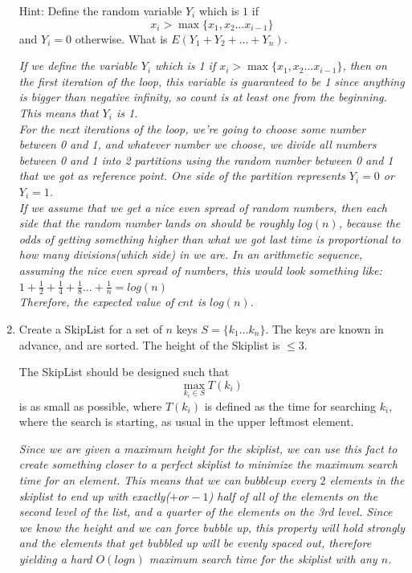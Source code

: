 \documentclass[11pt,epic,leqno,eepic,psfig,]{article}
\newcommand{\ans}[1]{{\color{brown}{\bf\Large Answer:} \sl  #1 \color{black}}}
\renewcommand{\i}{\item}
\begin{document}
\begin{enumerate}
Hint: Define the random variable $Y_i$ which is $1$ if
$$x_i > \max\{x_1, x_2\dots x_{i-1}\} $$
and $Y_i=0$ otherwise. What is
$E(Y_1+Y_2+\dots + Y_n )$.

\ans{If we define the variable $Y_i$ which is 1 if $x_i > \max\{x_1, x_2\dots x_{i-1}\} $, then on the first iteration of the loop, this variable is guaranteed to be 1 since anything is bigger than negative infinity, so count is at least one from the beginning. This means that $Y_i$ is 1.
\\ For the next iterations of the loop, we're going to choose some number between 0 and 1, and whatever number we choose, we divide all numbers between 0 and 1 into 2 partitions using the random number between 0 and 1 that we got as reference point. One side of the partition represents $Y_i = 0$ or $Y_i = 1$.
\\ If we assume that we get a nice even spread of random numbers, then each side that the random number lands on should be roughly $log(n)$, because the odds of getting something higher than what we got last time is proportional to how many divisions(which side) in we are. In an arithmetic sequence, assuming the nice even spread of numbers, this would look something like: 
\\ $1 + \frac{1}{2} + \frac{1}{4} +\frac{1}{8}...+ \frac{1}{n} = log(n)$ 
\\ Therefore, the expected value of $cnt$ is $log(n)$. }





\i  Create a SkipList for a set of $n$ keys
$S=\{k_1\dots k_n\}$.
The keys are known in advance, and are sorted. The height of the Skiplist is $\leq 3$.

The SkipList should be designed such that $$\max_{k_i\in S} T(k_i) $$ is as small as possible, where $T(k_i)$ is defined as the time for searching $k_i$, where the search is starting, as usual in the upper leftmost element.

\ans{Since we are given a maximum height for the skiplist, we can use this fact to create something closer to a perfect skiplist to minimize the maximum search time for an element.
This means that we can $bubble up$ every $2$ elements in the skiplist to end up with exactly($+ or -1$) half of all of the elements on the second level of the list, and a quarter of the elements on the 3rd level. Since we know the height and we can force bubble up, this property will hold strongly and the elements that get bubbled up will be evenly spaced out, therefore yielding a hard $O(logn)$ maximum search time for the skiplist with any $n$.}




\end{enumerate}
\end{document}

